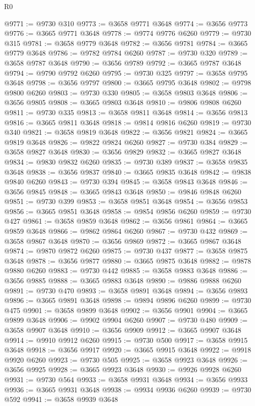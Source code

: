 \begin{lexlean}{R0}
\begin{coremodule}
@9771 := @9730 @310
@9773 := @3658 @9771 @3648
@9774 := @3656 @9773
@9776 := @3665 @9771 @3648
@9778 := @9774 @9776 @6260
@9779 := @9730 @315
@9781 := @3658 @9779 @3648
@9782 := @3656 @9781
@9784 := @3665 @9779 @3648
@9786 := @9782 @9784 @6260
@9787 := @9730 @320
@9789 := @3658 @9787 @3648
@9790 := @3656 @9789
@9792 := @3665 @9787 @3648
@9794 := @9790 @9792 @6260
@9795 := @9730 @325
@9797 := @3658 @9795 @3648
@9798 := @3656 @9797
@9800 := @3665 @9795 @3648
@9802 := @9798 @9800 @6260
@9803 := @9730 @330
@9805 := @3658 @9803 @3648
@9806 := @3656 @9805
@9808 := @3665 @9803 @3648
@9810 := @9806 @9808 @6260
@9811 := @9730 @335
@9813 := @3658 @9811 @3648
@9814 := @3656 @9813
@9816 := @3665 @9811 @3648
@9818 := @9814 @9816 @6260
@9819 := @9730 @340
@9821 := @3658 @9819 @3648
@9822 := @3656 @9821
@9824 := @3665 @9819 @3648
@9826 := @9822 @9824 @6260
@9827 := @9730 @384
@9829 := @3658 @9827 @3648
@9830 := @3656 @9829
@9832 := @3665 @9827 @3648
@9834 := @9830 @9832 @6260
@9835 := @9730 @389
@9837 := @3658 @9835 @3648
@9838 := @3656 @9837
@9840 := @3665 @9835 @3648
@9842 := @9838 @9840 @6260
@9843 := @9730 @394
@9845 := @3658 @9843 @3648
@9846 := @3656 @9845
@9848 := @3665 @9843 @3648
@9850 := @9846 @9848 @6260
@9851 := @9730 @399
@9853 := @3658 @9851 @3648
@9854 := @3656 @9853
@9856 := @3665 @9851 @3648
@9858 := @9854 @9856 @6260
@9859 := @9730 @427
@9861 := @3658 @9859 @3648
@9862 := @3656 @9861
@9864 := @3665 @9859 @3648
@9866 := @9862 @9864 @6260
@9867 := @9730 @432
@9869 := @3658 @9867 @3648
@9870 := @3656 @9869
@9872 := @3665 @9867 @3648
@9874 := @9870 @9872 @6260
@9875 := @9730 @437
@9877 := @3658 @9875 @3648
@9878 := @3656 @9877
@9880 := @3665 @9875 @3648
@9882 := @9878 @9880 @6260
@9883 := @9730 @442
@9885 := @3658 @9883 @3648
@9886 := @3656 @9885
@9888 := @3665 @9883 @3648
@9890 := @9886 @9888 @6260
@9891 := @9730 @470
@9893 := @3658 @9891 @3648
@9894 := @3656 @9893
@9896 := @3665 @9891 @3648
@9898 := @9894 @9896 @6260
@9899 := @9730 @475
@9901 := @3658 @9899 @3648
@9902 := @3656 @9901
@9904 := @3665 @9899 @3648
@9906 := @9902 @9904 @6260
@9907 := @9730 @480
@9909 := @3658 @9907 @3648
@9910 := @3656 @9909
@9912 := @3665 @9907 @3648
@9914 := @9910 @9912 @6260
@9915 := @9730 @500
@9917 := @3658 @9915 @3648
@9918 := @3656 @9917
@9920 := @3665 @9915 @3648
@9922 := @9918 @9920 @6260
@9923 := @9730 @505
@9925 := @3658 @9923 @3648
@9926 := @3656 @9925
@9928 := @3665 @9923 @3648
@9930 := @9926 @9928 @6260
@9931 := @9730 @564
@9933 := @3658 @9931 @3648
@9934 := @3656 @9933
@9936 := @3665 @9931 @3648
@9938 := @9934 @9936 @6260
@9939 := @9730 @592
@9941 := @3658 @9939 @3648

\end{coremodule}
\end{lexlean}
